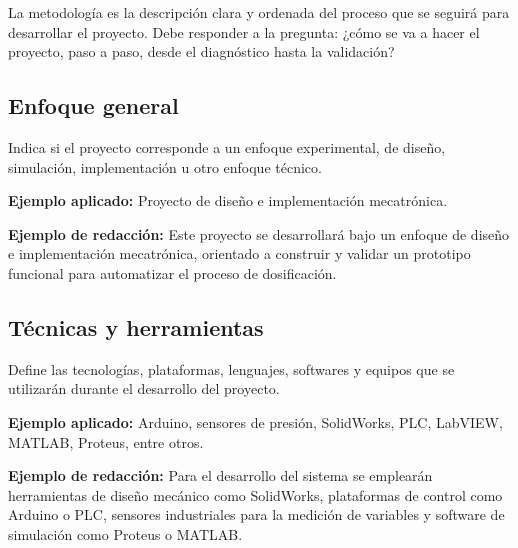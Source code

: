 \documentclass[12pt,letterpaper]{report}
\begin{document}
\begin{instrucciones}
La metodología es la descripción clara y ordenada del proceso que se seguirá para desarrollar el proyecto. Debe responder a la pregunta: ¿cómo se va a hacer el proyecto, paso a paso, desde el diagnóstico hasta la validación?
\end{instrucciones}

\subsection{Enfoque general}
\begin{instrucciones}
Indica si el proyecto corresponde a un enfoque experimental, de diseño, simulación, implementación u otro enfoque técnico.

\vspace{2mm}
\noindent \textbf{Ejemplo aplicado:} Proyecto de diseño e implementación mecatrónica.

\vspace{2mm}
\noindent \textbf{Ejemplo de redacción:} Este proyecto se desarrollará bajo un enfoque de diseño e implementación mecatrónica, orientado a construir y validar un prototipo funcional para automatizar el proceso de dosificación.
\end{instrucciones}

\subsection{Técnicas y herramientas}
\begin{instrucciones}
Define las tecnologías, plataformas, lenguajes, softwares y equipos que se utilizarán durante el desarrollo del proyecto.

\vspace{2mm}
\noindent \textbf{Ejemplo aplicado:} Arduino, sensores de presión, SolidWorks, PLC, LabVIEW, MATLAB, Proteus, entre otros.

\vspace{2mm}
\noindent \textbf{Ejemplo de redacción:} Para el desarrollo del sistema se emplearán herramientas de diseño mecánico como SolidWorks, plataformas de control como Arduino o PLC, sensores industriales para la medición de variables y software de simulación como Proteus o MATLAB.
\end{instrucciones}
\end{document}
